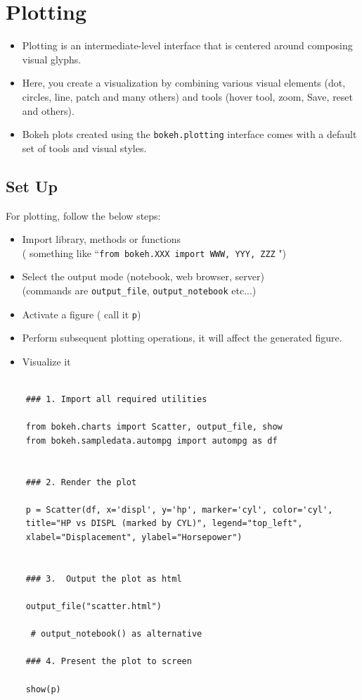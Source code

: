 \documentclass[a4paper,12pt]{article}
\begin{document}
\section{Plotting}
\begin{itemize}
\item Plotting is an intermediate-level interface that is centered around composing visual glyphs. 
\item Here, you create a visualization by combining various visual elements (dot, circles, line, patch and many others) 
and tools (hover tool, zoom, Save, reset and others).

\item Bokeh plots created using the \texttt{bokeh.plotting} interface comes with a default set of tools and visual styles. 
\end{itemize}
\newpage
\subsection{Set Up}
For plotting, follow the below steps:

\begin{itemize}
\item Import library, methods or functions \\ ( something like ``\texttt{from bokeh.XXX import WWW, YYY, ZZZ} ")
\item Select the output mode (notebook, web browser, server) \\ (commands are \texttt{output\_file}, \texttt{output\_notebook} etc...)
\item Activate a figure ( call it \texttt{p})
\item Perform subsequent plotting operations, it will affect the generated figure.
\item Visualize it
\end{itemize}

\begin{framed}
	\begin{verbatim}
	
	### 1. Import all required utilities
	
	from bokeh.charts import Scatter, output_file, show
	from bokeh.sampledata.autompg import autompg as df
	
	
	### 2. Render the plot
	
	p = Scatter(df, x='displ', y='hp', marker='cyl', color='cyl',
	title="HP vs DISPL (marked by CYL)", legend="top_left",
	xlabel="Displacement", ylabel="Horsepower")
	
	
	### 3.  Output the plot as html
	
	output_file("scatter.html")
	
	 # output_notebook() as alternative
	
	### 4. Present the plot to screen
	
	show(p)
	
	\end{verbatim}
\end{framed}
\newpage
\end{document}
